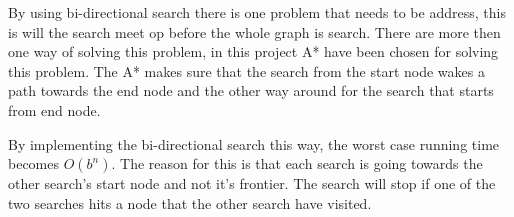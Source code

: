 By using bi-directional search there is one problem that needs to be address, this is will the search meet op before the whole graph is search. There are more then one way of solving this problem, in this project A* have been chosen for solving this problem. The A* makes sure that the search from the start node wakes a path towards the end node and the other way around for the search that starts from end node.

By implementing the bi-directional search this way, the worst case running time becomes $O(b^{n})$. The reason for this is that each search is going towards the other search's start node and not it's frontier. The search will stop if one of the two searches hits a node that the other search have visited.



